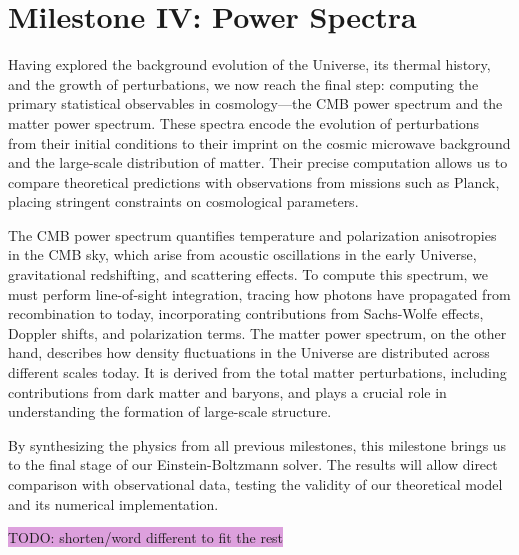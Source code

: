 \documentclass{aa}
\numberwithin{equation}{section}
\numberwithin{table}{section}
\numberwithin{figure}{section}
\begin{document}
\section{Milestone IV: Power Spectra}\label{sec: milestone IV}
Having explored the background evolution of the Universe, its thermal history, and the growth of perturbations, we now reach the final step: computing the primary statistical observables in cosmology—the CMB power spectrum and the matter power spectrum. These spectra encode the evolution of perturbations from their initial conditions to their imprint on the cosmic microwave background and the large-scale distribution of matter. Their precise computation allows us to compare theoretical predictions with observations from missions such as Planck, placing stringent constraints on cosmological parameters.  

The CMB power spectrum quantifies temperature and polarization anisotropies in the CMB sky, which arise from acoustic oscillations in the early Universe, gravitational redshifting, and scattering effects. To compute this spectrum, we must perform line-of-sight integration, tracing how photons have propagated from recombination to today, incorporating contributions from Sachs-Wolfe effects, Doppler shifts, and polarization terms. The matter power spectrum, on the other hand, describes how density fluctuations in the Universe are distributed across different scales today. It is derived from the total matter perturbations, including contributions from dark matter and baryons, and plays a crucial role in understanding the formation of large-scale structure.  

By synthesizing the physics from all previous milestones, this milestone brings us to the final stage of our Einstein-Boltzmann solver. The results will allow direct comparison with observational data, testing the validity of our theoretical model and its numerical implementation.

\colorbox{Plum}{TODO: shorten/word different to fit the rest}
\end{document}
